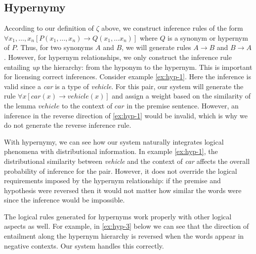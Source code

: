 \subsection*{Hypernymy}

According to our definition of $\zeta$ above, we construct inference rules of
the form $\forall x_1, \ldots, x_n[ P(x_1, \ldots, x_n) \to Q(x_1, \ldots x_n)
]$ where $Q$ is a synonym or hypernym of $P$.  Thus, for two synonyms $A$ and
$B$, we will generate rules $A \to B$ and $B \to A$.  However, for hypernym
relationships, we only construct the inference rule entailing {\it up} the
hierarchy: from the hyponym to the hypernym.  This is important for licensing
correct inferences.  Consider example \eqref{ex:hyp-1}.
Here the inference is valid since a {\it car} is a type of {\it vehicle}. 
For this pair, our system will generate the rule $\forall x[car(x) \to
vehicle(x)]$ and assign a weight based on the similarity of the lemma $vehicle$
to the context of $car$ in the premise sentence.  However, an inference in the
reverse direction of \eqref{ex:hyp-1} would be invalid, which is why we do not
generate the reverse inference rule.



With hypernymy, we can see how our system naturally integrates logical phenomena
with distributional information.  In example \eqref{ex:hyp-1}, the
distributional similarity between {\it vehicle} and the context of {\it car}
affects the overall probability of inference for the pair.  However, it does not
override the logical requirements imposed by the hypernym relationship: if the
premise and hypothesis were reversed then it would not matter how similar the
words were since the inference would be impossible.

The logical rules generated for hypernyms work properly with other logical
aspects as well.  For example, in \eqref{ex:hyp-3} below we can see that the
direction of entailment along the hypernym hierarchy is reversed when the words
appear in negative contexts.  Our system handles this correctly.

